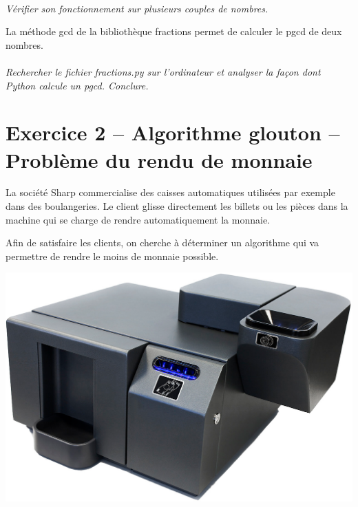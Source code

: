 \documentclass[11pt,oneside]{article}
\begin{document}
\paragraph{}
\textit{Vérifier son fonctionnement sur plusieurs couples de nombres.}


La méthode \textsf{gcd} de la bibliothèque \textsf{fractions} permet de calculer le pgcd de deux nombres.

\paragraph{}
\textit{Rechercher le fichier \textsf{fractions.py} sur l'ordinateur et analyser la façon dont Python calcule un pgcd. Conclure.}



\section*{Exercice 2 -- Algorithme glouton -- Problème du rendu de monnaie}
\begin{minipage}[c]{.6\linewidth}
La société Sharp commercialise des caisses automatiques utilisées par exemple dans des boulangeries. Le client glisse directement les billets ou les pièces dans la machine qui se charge de rendre automatiquement la monnaie. 
\begin{obj}
Afin de satisfaire les clients, on cherche à déterminer un algorithme qui va permettre de rendre le moins de monnaie possible. 
\end{obj}
\end{minipage}\hfill
\begin{minipage}[c]{.37\linewidth}
\begin{center}
\includegraphics[width=.9\textwidth]{png/sharp.png}
\end{center}
\end{minipage}
\end{document}
